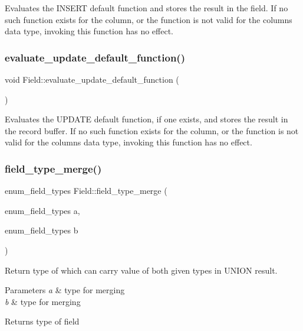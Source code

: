 Evaluates the {\ttfamily I\+N\+S\+E\+RT} default function and stores the result in the field. If no such function exists for the column, or the function is not valid for the column\textquotesingle{}s data type, invoking this function has no effect. \mbox{\label{classField_a7173d4f8198eab3214a638fd586c1ef8}} 
\subsubsection{\texorpdfstring{evaluate\+\_\+update\+\_\+default\+\_\+function()}{evaluate\_update\_default\_function()}}
{\footnotesize\ttfamily void Field\+::evaluate\+\_\+update\+\_\+default\+\_\+function (\begin{DoxyParamCaption}{ }\end{DoxyParamCaption})}

Evaluates the {\ttfamily U\+P\+D\+A\+TE} default function, if one exists, and stores the result in the record buffer. If no such function exists for the column, or the function is not valid for the column\textquotesingle{}s data type, invoking this function has no effect. \mbox{\label{classField_ab20100743e6462945e5c0a5130a9ab9d}} 
\subsubsection{\texorpdfstring{field\+\_\+type\+\_\+merge()}{field\_type\_merge()}}
{\footnotesize\ttfamily enum\+\_\+field\+\_\+types Field\+::field\+\_\+type\+\_\+merge (\begin{DoxyParamCaption}\item[{enum\+\_\+field\+\_\+types}]{a,  }\item[{enum\+\_\+field\+\_\+types}]{b }\end{DoxyParamCaption})\hspace{0.3cm}{\ttfamily [static]}}

Return type of which can carry value of both given types in U\+N\+I\+ON result.


\begin{DoxyParams}{Parameters}
{\em a} & type for merging \\
\hline
{\em b} & type for merging\\
\hline
\end{DoxyParams}
\begin{DoxyReturn}{Returns}
type of field 
\end{DoxyReturn}
\mbox{\label{classField_a8b534abe7f803ec84e85835387a9add6}} 
